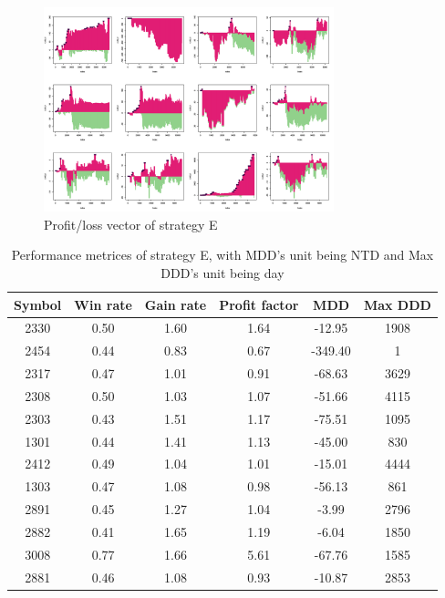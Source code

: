 \documentclass[12pt, letterpaper, oneside]{article}
\begin{document}
\begin{figure}[h]
    \centering
    \includegraphics[width=0.75\textwidth]{se_pl}
    \caption{Profit/loss vector of strategy E}
    \label{fig:e}
\end{figure}

\begin{table}[h!]
    \centering
    \begin{tabular}{ |c|c|c|c|c|c| }
        \hline
        Symbol & Win rate & Gain rate & Profit factor & MDD & Max DDD \\ [0.5ex]
        \hline
        2330 & 0.50 & 1.60 & 1.64 & -12.95 & 1908 \\
        2454 & 0.44 & 0.83 & 0.67 & -349.40 & 1 \\
        2317 & 0.47 & 1.01 & 0.91 & -68.63 & 3629 \\
        2308 & 0.50 & 1.03 & 1.07 & -51.66 & 4115 \\
        2303 & 0.43 & 1.51 & 1.17 & -75.51 & 1095 \\
        1301 & 0.44 & 1.41 & 1.13 & -45.00 & 830 \\
        2412 & 0.49 & 1.04 & 1.01 & -15.01 & 4444 \\
        1303 & 0.47 & 1.08 & 0.98 & -56.13 & 861 \\
        2891 & 0.45 & 1.27 & 1.04 & -3.99 & 2796 \\
        2882 & 0.41 & 1.65 & 1.19 & -6.04 & 1850 \\
        3008 & 0.77 & 1.66 & 5.61 & -67.76 & 1585 \\
        2881 & 0.46 & 1.08 & 0.93 & -10.87 & 2853 \\ [0.5ex]
        \hline
    \end{tabular}
    \caption{Performance metrices of strategy E, with MDD's unit being NTD and Max DDD's unit being day}
    \label{table:e}
\end{table}
\end{document}
